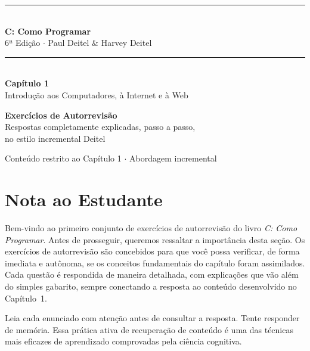 \documentclass[12pt,a4paper]{article}
\begin{document}
\begin{titlepage}
  \centering
  \vspace*{2cm}
  {\color{deitelblue}\rule{\linewidth}{2pt}}\\[0.4cm]
  {\huge\bfseries\color{deitelblue} C: Como Programar}\\[0.2cm]
  {\large\color{deitelblue} 6ª Edição $\cdot$ Paul Deitel \& Harvey Deitel}\\[0.2cm]
  {\color{deitelblue}\rule{\linewidth}{2pt}}\\[1cm]
  {\LARGE\bfseries Capítulo 1}\\[0.3cm]
  {\Large\color{deitelblue!80} Introdução aos Computadores, à Internet e à Web}\\[0.8cm]
  \begin{tcolorbox}[colback=deitellightblue, colframe=deitelblue, width=0.8\linewidth]
    \centering
    {\large\bfseries Exercícios de Autorrevisão}\\[0.2cm]
    {\normalsize Respostas completamente explicadas, passo a passo,\\
    no estilo incremental Deitel}
  \end{tcolorbox}
  \vfill
  {\small Conteúdo restrito ao Capítulo 1 $\cdot$ Abordagem incremental}
\end{titlepage}

\section*{Nota ao Estudante}

Bem-vindo ao primeiro conjunto de exercícios de autorrevisão do livro \textit{C: Como Programar}.
Antes de prosseguir, queremos ressaltar a importância desta seção. Os exercícios de autorrevisão
são concebidos para que você possa verificar, de forma imediata e autônoma, se os conceitos
fundamentais do capítulo foram assimilados. Cada questão é respondida de maneira detalhada,
com explicações que vão além do simples gabarito, sempre conectando a resposta ao conteúdo
desenvolvido no Capítulo~1.

\begin{boaprática}
  Leia cada enunciado com atenção antes de consultar a resposta. Tente
  responder de memória. Essa prática ativa de recuperação de conteúdo é uma
  das técnicas mais eficazes de aprendizado comprovadas pela ciência cognitiva.
\end{boaprática}

\newpage
\tableofcontents
\newpage
\end{document}
